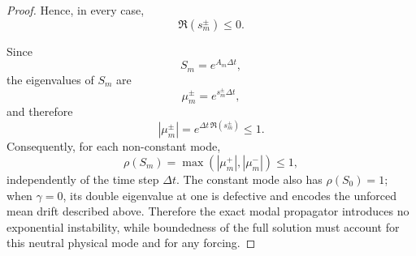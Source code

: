 \documentclass{Configuration_Files/PoliMi3i_thesis}
\begin{document}
\begin{proof}
Hence, in every case,
\begin{equation*}
\Re(s_m^\pm)\le0.
\end{equation*}

Since
\begin{equation*}
S_m=e^{A_m\Delta t},
\end{equation*}
the eigenvalues of $S_m$ are
\begin{equation*}
\mu_m^\pm
=
e^{s_m^\pm\Delta t},
\end{equation*}
and therefore
\begin{equation*}
|\mu_m^\pm|
=
e^{\Delta t\,\Re(s_m^\pm)}
\le1.
\end{equation*}
Consequently, for each non-constant mode,
\begin{equation*}
\rho(S_m)
=
\max\!\left(
|\mu_m^+|,
|\mu_m^-|
\right)
\le1,
\end{equation*}
independently of the time step $\Delta t$. The constant mode also has
$\rho(S_0)=1$; when $\gamma=0$, its double eigenvalue at one is defective and
encodes the unforced mean drift described above. Therefore the exact modal
propagator introduces no exponential instability, while boundedness of the
full solution must account for this neutral physical mode and for any forcing.
\end{proof}
\end{document}
